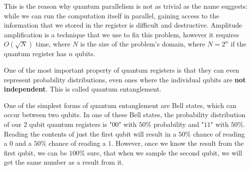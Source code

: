 This is the reason why quantum parallelism is not as trivial as the name suggests: while we can run the computation itself in parallel, gaining access to the information that we stored in the register is difficult and destructive. Amplitude amplification is a technique that we use to fix this problem, however it requires $O(\sqrt{N})$ time, where $N$ is the size of the problem's domain, where $N=2^n$ if the quantum register has $n$ qubits.

One of the most important property of quantum registers is that they can even represent probability distributions, even ones where the individual qubits are \textbf{not independent}. This is called quantum entanglement.

One of the simplest forms of quantum entanglement are Bell states, which can occur between two qubits. In one of these Bell states, the probability distribution of our 2 qubit quantum registers is "$00$" with $50\%$ probability and "$11$" with $50\%$. Reading the contents of just the first qubit will result in a $50\%$ chance of reading a $0$ and a $50\%$ chance of reading a $1$. However, once we know the result from the first qubit, we can be $100\%$ sure, that when we sample the second qubit, we will get the same number as a result from it.
